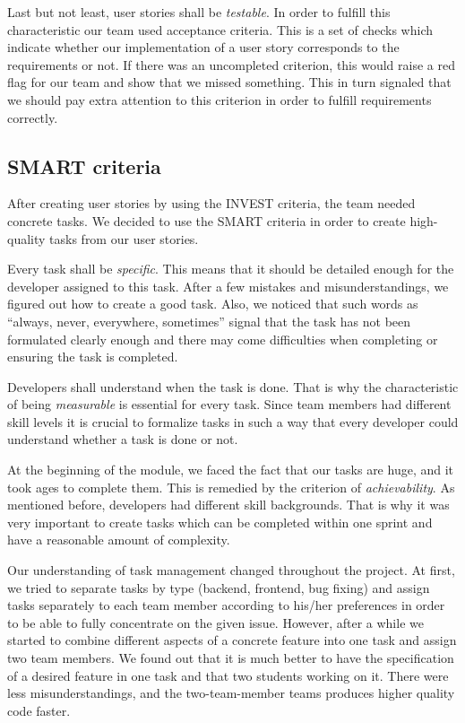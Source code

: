 Last but not least, user stories shall be \emph{testable}. In order to fulfill this characteristic our team used acceptance criteria. This is a set of checks which indicate whether our implementation of a user story corresponds to the requirements or not. If there was an uncompleted criterion, this would raise a red flag for our team and show that we missed something. This in turn signaled that we should pay extra attention to this criterion in order to fulfill requirements correctly.

\subsection{SMART criteria}
After creating user stories by using the INVEST criteria, the team needed concrete tasks. We decided to use the SMART criteria in order to create high-quality tasks from our user stories.

Every task shall be \emph{specific}. This means that it should be detailed enough for the developer assigned to this task. After a few mistakes and misunderstandings, we figured out how to create a good task. Also, we noticed that such words as “always, never, everywhere, sometimes” signal that the task has not been formulated clearly enough and there may come difficulties when completing or ensuring the task is completed.

Developers shall understand when the task is done. That is why the characteristic of being \emph{measurable} is essential for every task. Since team members had different skill levels it is crucial to formalize tasks in such a way that every developer could understand whether a task is done or not.

At the beginning of the module, we faced the fact that our tasks are huge, and it took ages to complete them. This is remedied by the criterion of \emph{achievability}. As mentioned before, developers had different skill backgrounds. That is why it was very important to create tasks which can be completed within one sprint and have a reasonable amount of complexity.

Our understanding of task management changed throughout the project. At first, we tried to separate tasks by type (backend, frontend, bug fixing) and assign tasks separately to each team member according to his/her preferences in order to be able to fully concentrate on the given issue. However, after a while we started to combine different aspects of a concrete feature into one task and assign two team members. We found out that it is much better to have the specification of a desired feature in one task and that two students working on it. There were less misunderstandings, and the two-team-member teams produces higher quality code faster.

